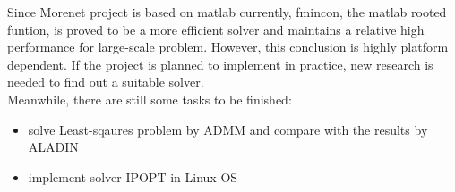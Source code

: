 \documentclass{article}
\begin{document}
Since Morenet project is based on matlab currently, fmincon, the matlab rooted funtion, is proved to be a more efficient solver and maintains a relative high performance for large-scale problem. However, this conclusion is highly platform dependent. If the project is planned to implement in practice, new research is needed to find out a suitable solver. \\

Meanwhile, there are still some tasks to be finished:\\

\begin{itemize}
    \item solve Least-sqaures problem by ADMM and compare with the results by ALADIN
    \item implement solver IPOPT in Linux OS
\end{itemize}

{}
\end{document}
